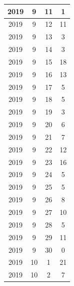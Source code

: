 \begin{longtable} {|c|c|c|c|}
\hline
2019         & 9            & 11           & 1                         \\ 
\hline
2019         & 9            & 12           & 11                        \\ 
\hline
2019         & 9            & 13           & 3                         \\ 
\hline
2019         & 9            & 14           & 3                         \\ 
\hline
2019         & 9            & 15           & 18                        \\ 
\hline
2019         & 9            & 16           & 13                        \\ 
\hline
2019         & 9            & 17           & 5                         \\ 
\hline
2019         & 9            & 18           & 5                         \\ 
\hline
2019         & 9            & 19           & 3                         \\ 
\hline
2019         & 9            & 20           & 6                         \\ 
\hline
2019         & 9            & 21           & 7                         \\ 
\hline
2019         & 9            & 22           & 12                        \\ 
\hline
2019         & 9            & 23           & 16                        \\ 
\hline
2019         & 9            & 24           & 5                         \\ 
\hline
2019         & 9            & 25           & 5                         \\ 
\hline
2019         & 9            & 26           & 8                         \\ 
\hline
2019         & 9            & 27           & 10                        \\ 
\hline
2019         & 9            & 28           & 5                         \\ 
\hline
2019         & 9            & 29           & 11                        \\ 
\hline
2019         & 9            & 30           & 0                         \\ 
\hline
2019         & 10           & 1            & 21                        \\ 
\hline
2019         & 10           & 2            & 7                         \\ 

\end{longtable}

